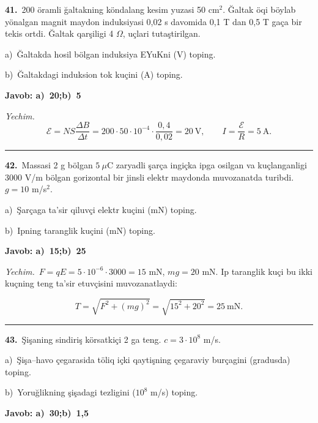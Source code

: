 \documentclass[11pt,a4paper]{article}
\begin{document}
\noindent\textbf{41.}\ 200 öramli ğaltakning köndalang kesim yuzasi 50 cm$^2$. Ğaltak öqi böylab yönalgan magnit maydon induksiyasi 0,02 s davomida 0,1 T dan 0,5 T gaça bir tekis ortdi. Ğaltak qarşiligi 4 $\Omega$, uçlari tutaştirilgan.\par
\noindent\hspace*{4mm}a)\ Ğaltakda hosil bölgan induksiya EYuKni (V) toping.\par
\noindent\hspace*{4mm}b)\ Ğaltakdagi induksion tok kuçini (A) toping.\par
\noindent\colorbox{gray!12}{\parbox{\dimexpr\linewidth-2\fboxsep}{\textbf{Javob: a)\ 20;\quad b)\ 5}}}\par\smallskip
\noindent\textit{Yechim.}\ \[\mathcal E=NS\frac{\Delta B}{\Delta t}=200\cdot50\cdot10^{-4}\cdot\frac{0{,}4}{0{,}02}=20\ \text{V},\qquad I=\frac{\mathcal E}{R}=5\ \text{A}.\]\par\medskip\hrule\medskip
{}\noindent\textbf{42.}\ Massasi 2 g bölgan $5\ \mu$C zaryadli şarça ingiçka ipga osilgan va kuçlanganligi 3000 V/m bölgan gorizontal bir jinsli elektr maydonda muvozanatda turibdi. $g=10$ m/s$^2$.\par
\noindent\hspace*{4mm}a)\ Şarçaga ta’sir qiluvçi elektr kuçini (mN) toping.\par
\noindent\hspace*{4mm}b)\ Ipning taranglik kuçini (mN) toping.\par
\noindent\colorbox{gray!12}{\parbox{\dimexpr\linewidth-2\fboxsep}{\textbf{Javob: a)\ 15;\quad b)\ 25}}}\par\smallskip
\noindent\textit{Yechim.}\ $F=qE=5\cdot10^{-6}\cdot3000=15$ mN, $mg=20$ mN. Ip taranglik kuçi bu ikki kuçning teng ta’sir etuvçisini muvozanatlaydi:\par
\[T=\sqrt{F^2+(mg)^2}=\sqrt{15^2+20^2}=25\ \text{mN}.\]\par\medskip\hrule\medskip
{}\noindent\textbf{43.}\ Şişaning sindiriş körsatkiçi 2 ga teng. $c=3\cdot10^8$ m/s.\par
\noindent\hspace*{4mm}a)\ Şişa–havo çegarasida töliq içki qaytişning çegaraviy burçagini (gradusda) toping.\par
\noindent\hspace*{4mm}b)\ Yoruğlikning şişadagi tezligini ($10^8$ m/s) toping.\par
\noindent\colorbox{gray!12}{\parbox{\dimexpr\linewidth-2\fboxsep}{\textbf{Javob: a)\ 30;\quad b)\ 1,5}}}\par\smallskip
\end{document}
